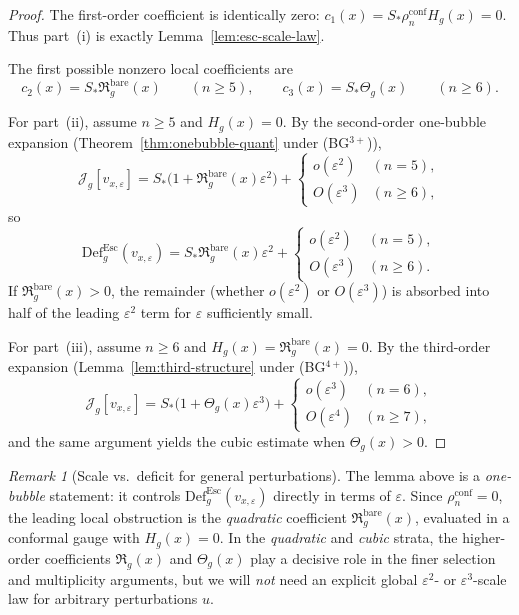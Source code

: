 \documentclass[11pt,reqno,a4paper]{amsart}
\numberwithin{equation}{section}
\newcommand{\Def}{\mathrm{Def}}
\theoremstyle{plain}
\newcommand{\Esc}{\ensuremath{\mathrm{Esc}}}
\theoremstyle{remark}
\newtheorem{remark}[theorem]{Remark}
\theoremstyle{plain}
\begin{document}
\begin{proof}
The first-order coefficient is identically zero:
$c_1(x)=S_\ast\rho_n^{\mathrm{conf}}H_g(x)=0$.
Thus part~\textup{(i)} is exactly Lemma~\ref{lem:esc-scale-law}.

The first possible nonzero local coefficients are
\[
c_2(x)=S_\ast\mathfrak R_g^{\mathrm{bare}}(x)\qquad(n\ge5),
\qquad
c_3(x)=S_\ast\Theta_g(x)\qquad(n\ge6).
\]

For part~\textup{(ii)}, assume $n\ge5$ and $H_g(x)=0$. By the second-order one-bubble expansion (Theorem~\ref{thm:onebubble-quant} under \textup{(BG$^{3+}$)}),
\[
\mathcal J_g[v_{x,\varepsilon}]
= S_\ast\bigl(1+\mathfrak R_g^{\mathrm{bare}}(x)\varepsilon^2\bigr)
+ \begin{cases}o(\varepsilon^2)&(n=5),\\O(\varepsilon^3)&(n\ge6),\end{cases}
\]
so
\[
\Def^{\Esc}_g(v_{x,\varepsilon})
= S_\ast\mathfrak R_g^{\mathrm{bare}}(x)\varepsilon^2
+ \begin{cases}o(\varepsilon^2)&(n=5),\\O(\varepsilon^3)&(n\ge6).\end{cases}
\]
If $\mathfrak R_g^{\mathrm{bare}}(x)>0$, the remainder (whether $o(\varepsilon^2)$
or $O(\varepsilon^3)$) is absorbed into half of the leading $\varepsilon^2$ term
for $\varepsilon$ sufficiently small.

For part~\textup{(iii)}, assume $n\ge6$ and $H_g(x)=\mathfrak R_g^{\mathrm{bare}}(x)=0$. By the third-order expansion (Lemma~\ref{lem:third-structure} under \textup{(BG$^{4+}$)}),
\[
\mathcal J_g[v_{x,\varepsilon}]
= S_\ast\bigl(1+\Theta_g(x)\varepsilon^3\bigr) + \begin{cases}o(\varepsilon^3)&(n=6),\\O(\varepsilon^4)&(n\ge7),\end{cases}
\]
and the same argument yields the cubic estimate when $\Theta_g(x)>0$.
\end{proof}

\begin{remark}[Scale vs.\ deficit for general perturbations]
The lemma above is a \emph{one-bubble} statement: it controls $\Def^{\Esc}_g(v_{x,\varepsilon})$ directly in terms of $\varepsilon$. Since $\rho_n^{\mathrm{conf}}=0$, the leading local obstruction is the \emph{quadratic} coefficient $\mathfrak R_g^{\mathrm{bare}}(x)$, evaluated in a conformal gauge with $H_g(x)=0$. In the \emph{quadratic} and \emph{cubic} strata, the higher-order coefficients $\mathfrak R_g(x)$ and $\Theta_g(x)$ play a decisive role in the finer selection and multiplicity arguments, but we will \emph{not} need an explicit global $\varepsilon^2$- or $\varepsilon^3$-scale law for arbitrary perturbations $u$.
\end{remark}
\end{document}
